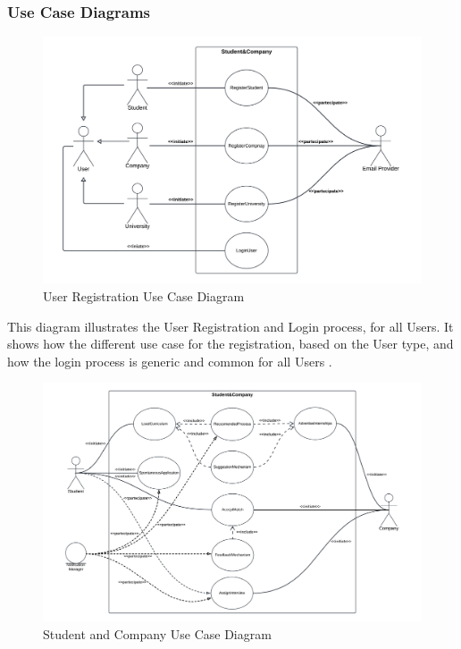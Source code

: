 \subsubsection{Use Case Diagrams}
\begin{figure}[H]
    \centering
    \includegraphics[width=1 \textwidth]{Diagrams/UseDiagrams/UserRegistrationUseCase.png}
    \caption{User Registration Use Case Diagram}
    \label{fig:UserRegistrationUseCaseDiagram}
\end{figure}
This diagram illustrates the User Registration and Login process, for all Users. It shows how the different use case for the registration, based on the User type, and how the login process is generic and common for all Users
\clearpage.
\begin{figure}[H]
    \centering
    \includegraphics[width=1 \textwidth]{Diagrams/UseDiagrams/Student Company Use Case.png}
    \caption{Student and Company Use Case Diagram}
    \label{fig:StudentCompanyUseCaseDiagram}
\end{figure}
